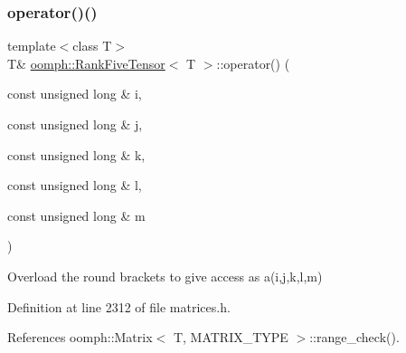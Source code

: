 \mbox{\label{classoomph_1_1RankFiveTensor_a3b326990dff5d065648c223cf9bcfb5a}} 
\subsubsection{\texorpdfstring{operator()()}{operator()()}\hspace{0.1cm}{\footnotesize\ttfamily [1/2]}}
{\footnotesize\ttfamily template$<$class T$>$ \\
T\& \hyperlink{classoomph_1_1RankFiveTensor}{oomph\+::\+Rank\+Five\+Tensor}$<$ T $>$\+::operator() (\begin{DoxyParamCaption}\item[{const unsigned long \&}]{i,  }\item[{const unsigned long \&}]{j,  }\item[{const unsigned long \&}]{k,  }\item[{const unsigned long \&}]{l,  }\item[{const unsigned long \&}]{m }\end{DoxyParamCaption})\hspace{0.3cm}{\ttfamily [inline]}}



Overload the round brackets to give access as a(i,j,k,l,m) 



Definition at line 2312 of file matrices.\+h.



References oomph\+::\+Matrix$<$ T, M\+A\+T\+R\+I\+X\+\_\+\+T\+Y\+P\+E $>$\+::range\+\_\+check().

\mbox{\label{classoomph_1_1RankFiveTensor_a0d2ef9d9bcc8103b2d60f768ffa60532}} 
